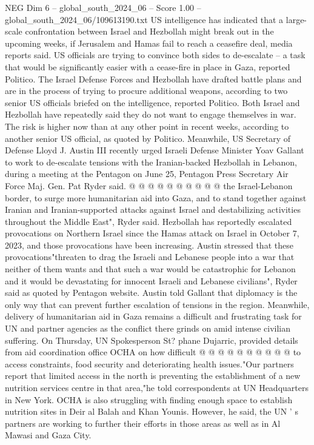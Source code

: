 \begin{textsample}{NEG Dim 6 – global\_south\_2024\_06 – Score 1.00 – global\_south\_2024\_06/109613190.txt}  \label{ex:f6_neg_269}
US intelligence has indicated that a large-scale confrontation between Israel and Hezbollah might break out in the upcoming weeks, if Jerusalem and Hamas fail to reach a ceasefire deal, media reports said.
US officials are trying to convince both sides to de-escalate -- a task that would be significantly easier with a cease-fire in place in Gaza, reported Politico.
The Israel Defense Forces and Hezbollah have drafted battle plans and are in the process of trying to procure additional weapons, according to two senior US officials briefed on the intelligence, reported Politico.
Both Israel and Hezbollah have repeatedly said they do not want to engage themselves in war.
The risk is higher now than at any other point in recent weeks, according to another senior US official, as quoted by Politico.
Meanwhile, US Secretary of Defense Lloyd J.
Austin III recently urged Israeli Defense Minister Yoav Gallant to work to de-escalate tensions with the Iranian-backed Hezbollah in Lebanon, during a meeting at the Pentagon on June 25, Pentagon Press Secretary Air Force Maj.
Gen.
Pat Ryder said. @ @ @ @ @ @ @ @ @ @ the Israel-Lebanon border, to surge more humanitarian aid into Gaza, and to stand together against Iranian and Iranian-supported attacks against Israel and destabilizing activities throughout the Middle East", Ryder said.
Hezbollah has reportedly escalated provocations on Northern Israel since the Hamas attack on Israel in October 7, 2023, and those provocations have been increasing.
Austin stressed that these provocations"threaten to drag the Israeli and Lebanese people into a war that neither of them wants and that such a war would be catastrophic for Lebanon and it would be devastating for innocent Israeli and Lebanese civilians", Ryder said as quoted by Pentagon website.
Austin told Gallant that diplomacy is the only way that can prevent further escalation of tensions in the region.
Meanwhile, delivery of humanitarian aid in Gaza remains a difficult and frustrating task for UN and partner agencies as the conflict there grinds on amid intense civilian suffering.
On Thursday, UN Spokesperson St? phane Dujarric, provided details from aid coordination office OCHA on how difficult @ @ @ @ @ @ @ @ @ @ to access constraints, food security and deteriorating health issues."Our partners report that limited access in the north is preventing the establishment of a new nutrition services centre in that area,"he told correspondents at UN Headquarters in New York.
OCHA is also struggling with finding enough space to establish nutrition sites in Deir al Balah and Khan Younis.
However, he said, the UN ' s partners are working to further their efforts in those areas as well as in Al Mawasi and Gaza City.

\end{textsample}
